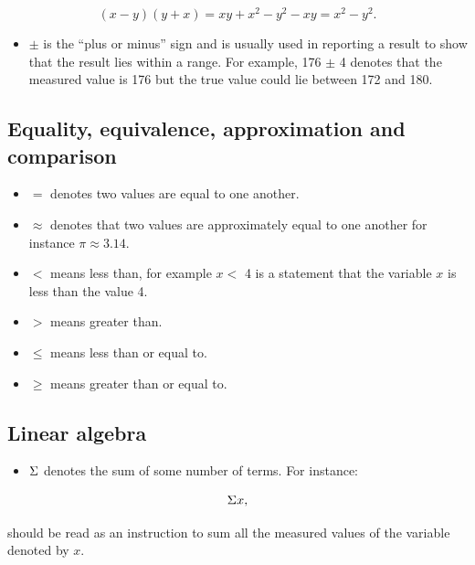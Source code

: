\documentclass[
]{book}
\providecommand{\tightlist}{%
  \setlength{\itemsep}{0pt}\setlength{\parskip}{0pt}}
\begin{document}
\[(x-y)(y+x)=xy+x^2-y^2-xy=x^2-y^2.\]

\begin{itemize}
\tightlist
\item
  \(\pm\) is the ``plus or minus'' sign and is usually used in reporting a result to show that the result lies within a range. For example, 176 \(\pm\) 4 denotes that the measured value is 176 but the true value could lie between 172 and 180.
\end{itemize}

\hypertarget{equality-equivalence-approximation-and-comparison}{%
\subsection*{Equality, equivalence, approximation and comparison}\label{equality-equivalence-approximation-and-comparison}}

\begin{itemize}
\tightlist
\item
  \(=\) denotes two values are equal to one another.
\item
  \(\approx\) denotes that two values are approximately equal to one another for instance \(\pi \approx 3.14.\)
\item
  \(<\) means less than, for example \(x <\) 4 is a statement that the variable \(x\) is less than the value 4.
\item
  \(>\) means greater than.
\item
  \(\le\) means less than or equal to.
\item
  \(\ge\) means greater than or equal to.
\end{itemize}

\hypertarget{linear-algebra}{%
\subsection*{Linear algebra}\label{linear-algebra}}

\begin{itemize}
\tightlist
\item
  \(\large\Sigma\) denotes the sum of some number of terms. For instance:
\end{itemize}

\[\large\Sigma x,\]

should be read as an instruction to sum all the measured values of the variable denoted by \(x\).
\end{document}
